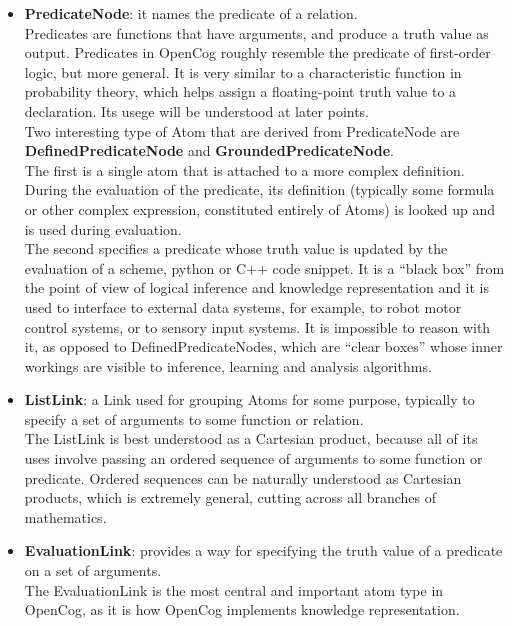 \begin{itemize}
	\item \textbf{PredicateNode}: it names the predicate of a relation. \\
Predicates are functions that have arguments, and produce a truth value as output. Predicates in OpenCog roughly resemble the predicate of first-order logic, but more general. It is very similar to a characteristic function in probability theory, which helps assign a floating-point truth value to a declaration. Its usege will be understood at later points. \\
Two interesting type of Atom that are derived from PredicateNode are \textbf{DefinedPredicateNode} and \textbf{GroundedPredicateNode}. \\
The first is a single atom that is attached to a more complex definition. During the evaluation of the predicate, its definition (typically some formula or other complex expression, constituted entirely of Atoms) is looked up and is used during evaluation. \\
The second specifies a predicate whose truth value is updated by the evaluation of a scheme, python or C++ code snippet. It is a \enquote{black box} from the point of view of logical inference and knowledge representation and it is used to interface to external data systems, for example, to robot motor control systems, or to sensory input systems. It is impossible to reason with it, as opposed to DefinedPredicateNodes, which are \enquote{clear boxes} whose inner workings are visible to inference, learning and analysis algorithms.

	\item \textbf{ListLink}: a Link used for grouping Atoms for some purpose, typically to specify a set of arguments to some function or relation. \\
The ListLink is best understood as a Cartesian product\footnotemark{}, because all of its uses involve passing an ordered sequence of arguments to some function or predicate. Ordered sequences can be naturally understood as Cartesian products, which is extremely general, cutting across all branches of mathematics.

	\item \textbf{EvaluationLink}: provides a way for specifying the truth value of a predicate on a set of arguments. \\
The EvaluationLink is the most central and important atom type in OpenCog, as it is how OpenCog implements knowledge representation.


\end{itemize}
